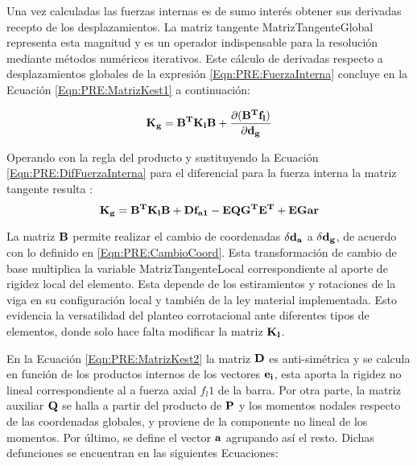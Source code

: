 Una vez calculadas las fuerzas internas es de sumo interés obtener sus derivadas recepto de los desplazamientos. La matriz tangente \gls{MatrizTangenteGlobal} representa esta magnitud y es un operador indispensable para la resolución mediante métodos numéricos iterativos. Este cálculo de derivadas respecto a desplazamientos globales de la expresión \eqref{Eqn:PRE:FuerzaInterna} concluye en la Ecuación \eqref{Eqn:PRE:MatrizKest1} a continuación:

\begin{equation}\label{Eqn:PRE:MatrizKest1}
\bf{K_g}=\bf{B}^T\bf{K_l}\bf{B}+\frac{\partial (\bf{B}^T\bf{f}_l)}{\partial \bf{d}_g}
\end{equation}

Operando con la regla del producto y sustituyendo la Ecuación \eqref{Eqn:PRE:DifFuerzaInterna} para el diferencial para la fuerza interna la matriz tangente resulta :
\begin{equation} \label{Eqn:PRE:MatrizKest2}
	\bf{K_g}=\bf{B}^T\bf{K_l}\bf{B}+\bf{D} f_{a1}-\bf{E}\bf{Q}\bf{G^T}\bf{E^T} +\bf{EGar}
\end{equation}


La matriz $\bf{B}$ permite realizar el cambio de coordenadas $\delta \bf{d_a}$ a  $\delta \bf{d_g}$, de acuerdo con lo definido en \eqref{Eqn:PRE:CambioCoord}. Esta transformación de cambio de base multiplica la variable \gls{MatrizTangenteLocal} correspondiente al aporte de rigidez local del elemento. Esta depende de los estiramientos y rotaciones de la viga en su configuración local y también de la ley material implementada. Esto evidencia la versatilidad del planteo corrotacional ante diferentes tipos de elementos, donde solo hace falta modificar la matriz $\bf{K_l}$.


En la Ecuación \eqref{Eqn:PRE:MatrizKest2} la matriz  $\bf{D}$ es anti-simétrica y se calcula en función de los productos internos de los vectores $\bf{e_i}$, esta aporta la rigidez no lineal correspondiente al a fuerza axial $f_l1$ de la barra. Por otra parte, la matriz auxiliar $\bf{Q}$ se halla a partir del producto de $\bf{P}$ y los momentos nodales respecto de las coordenadas globales, y proviene de la componente no lineal de los momentos. Por último, se define el vector $\bf{a}$ agrupando así el resto. Dichas defunciones se encuentran en las siguientes Ecuaciones:

